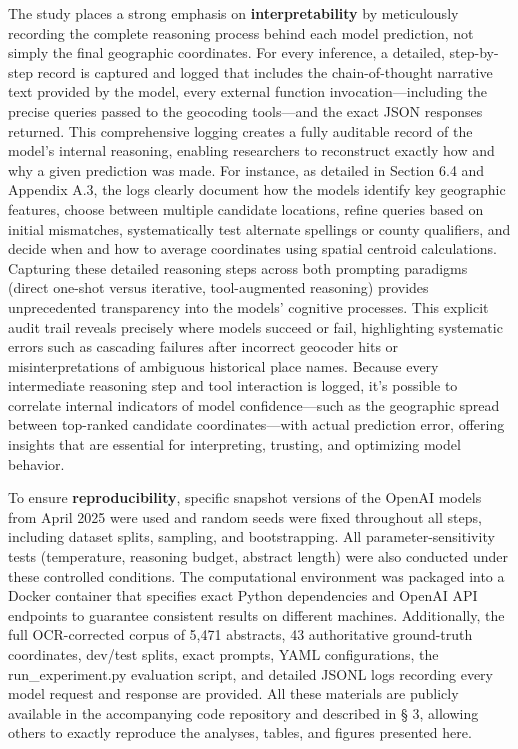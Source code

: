 \documentclass[
  10pt]{article}
\begin{document}
The study places a strong emphasis on \textbf{interpretability} by
meticulously recording the complete reasoning process behind each model
prediction, not simply the final geographic coordinates. For every
inference, a detailed, step-by-step record is captured and logged that
includes the chain-of-thought narrative text provided by the model,
every external function invocation---including the precise queries
passed to the geocoding tools---and the exact JSON responses returned.
This comprehensive logging creates a fully auditable record of the
model's internal reasoning, enabling researchers to reconstruct exactly
how and why a given prediction was made. For instance, as detailed in
Section 6.4 and Appendix A.3, the logs clearly document how the models
identify key geographic features, choose between multiple candidate
locations, refine queries based on initial mismatches, systematically
test alternate spellings or county qualifiers, and decide when and how
to average coordinates using spatial centroid calculations. Capturing
these detailed reasoning steps across both prompting paradigms (direct
one-shot versus iterative, tool-augmented reasoning) provides
unprecedented transparency into the models' cognitive processes. This
explicit audit trail reveals precisely where models succeed or fail,
highlighting systematic errors such as cascading failures after
incorrect geocoder hits or misinterpretations of ambiguous historical
place names. Because every intermediate reasoning step and tool
interaction is logged, it's possible to correlate internal indicators of
model confidence---such as the geographic spread between top-ranked
candidate coordinates---with actual prediction error, offering insights
that are essential for interpreting, trusting, and optimizing model
behavior.

To ensure \textbf{reproducibility}, specific snapshot versions of the
OpenAI models from April 2025 were used and random seeds were fixed
throughout all steps, including dataset splits, sampling, and
bootstrapping. All parameter-sensitivity tests (temperature, reasoning
budget, abstract length) were also conducted under these controlled
conditions. The computational environment was packaged into a Docker
container that specifies exact Python dependencies and OpenAI API
endpoints to guarantee consistent results on different machines.
Additionally, the full OCR-corrected corpus of 5,471 abstracts, 43
authoritative ground-truth coordinates, dev/test splits, exact prompts,
YAML configurations, the run\_experiment.py evaluation script, and
detailed JSONL logs recording every model request and response are
provided. All these materials are publicly available in the accompanying
code repository and described in § 3, allowing others to exactly
reproduce the analyses, tables, and figures presented here.
\end{document}
